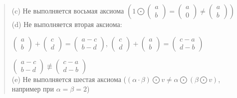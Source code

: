 \documentclass{article}
\begin{document}
\begin{quote}
    (c) Не выполняется восьмая аксиома $(1 \bigodot \begin{pmatrix} a \\ b \end{pmatrix} = 
    \begin{pmatrix} a \\ 0 \end{pmatrix} \not = \begin{pmatrix} a \\ b \end{pmatrix})$\\
    
    (d) Не выполняется вторая аксиома:
    
    $\begin{pmatrix} a \\ b \end{pmatrix} + \begin{pmatrix} c \\ d \end{pmatrix}  = \begin{pmatrix} a - c \\ b - d \end{pmatrix}$, \qquad
    $\begin{pmatrix} c \\ d \end{pmatrix} + \begin{pmatrix} a \\ b \end{pmatrix}  = \begin{pmatrix} c - a \\ d - b \end{pmatrix}$

    $\begin{pmatrix} a - c \\ b - d \end{pmatrix} \not \equiv \begin{pmatrix} c - a \\ d - b\end{pmatrix}$\\
    
    (e) Не выполняется шестая аксиома ($(\alpha \cdot \beta) \bigodot v \not =
    \alpha \bigodot (\beta \bigodot v)$, например при $\alpha = \beta = 2$)
\end{quote}
\end{document}
